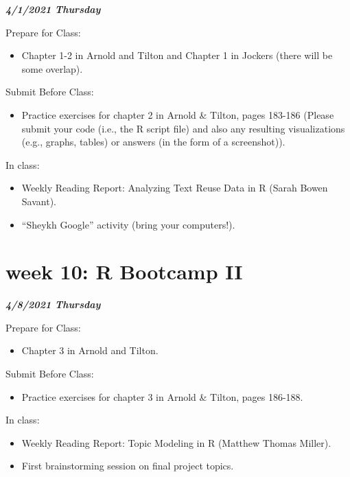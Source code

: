 \documentclass[
]{book}
\providecommand{\tightlist}{%
  \setlength{\itemsep}{0pt}\setlength{\parskip}{0pt}}
\begin{document}
\textbf{\emph{4/1/2021 Thursday}}

Prepare for Class:

\begin{itemize}
\tightlist
\item
  Chapter 1-2 in Arnold and Tilton and Chapter 1 in Jockers (there will be some overlap).
\end{itemize}

Submit Before Class:

\begin{itemize}
\tightlist
\item
  Practice exercises for chapter 2 in Arnold \& Tilton, pages 183-186 (Please submit your code (i.e., the R script file) and also any resulting visualizations (e.g., graphs, tables) or answers (in the form of a screenshot)).
\end{itemize}

In class:

\begin{itemize}
\tightlist
\item
  Weekly Reading Report: Analyzing Text Reuse Data in R (Sarah Bowen Savant).
\item
  ``Sheykh Google'' activity (bring your computers!).
\end{itemize}

\hypertarget{week-10-r-bootcamp-ii-1}{%
\chapter{week 10: R Bootcamp II}\label{week-10-r-bootcamp-ii-1}}

\textbf{\emph{4/8/2021 Thursday}}

Prepare for Class:

\begin{itemize}
\tightlist
\item
  Chapter 3 in Arnold and Tilton.
\end{itemize}

Submit Before Class:

\begin{itemize}
\tightlist
\item
  Practice exercises for chapter 3 in Arnold \& Tilton, pages 186-188.
\end{itemize}

In class:

\begin{itemize}
\tightlist
\item
  Weekly Reading Report: Topic Modeling in R (Matthew Thomas Miller).
\item
  First brainstorming session on final project topics.
\end{itemize}
\end{document}
